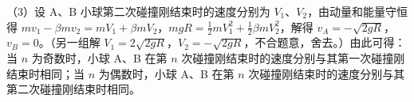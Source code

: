 \documentclass[\gkver]{gaokaozhenti}
\begin{document}
\begin{enumerate}
{（3）设 A、B 小球第二次碰撞刚结束时的速度分别为 $V_{1}$、$V_{2}$，由动量和能量守恒得 $mv_{1}-\beta mv_{2}=mV_{1}+\beta mV_{2}$，$mgR=\frac{1}{2}mV_{1}^{2}+\frac{1}{2}\beta mV_{2}^{2}$，解得 $v_{A}=-\sqrt{2gR}$，$v_{B}=0$。（另一组解 $V_{1}=2\sqrt{2gR}$，$V_{2}=-\sqrt{2gR}$，不合题意，舍去。）由此可得：当 $n$ 为奇数时，小球 A、B 在第 $n$ 次碰撞刚结束时的速度分别与其第一次碰撞刚结束时相同；当 $n$ 为偶数时，小球 A、B 在第 $n$ 次碰撞刚结束时的速度分别与其第二次碰撞刚结束时相同。
}

\end{enumerate}
\end{document}
